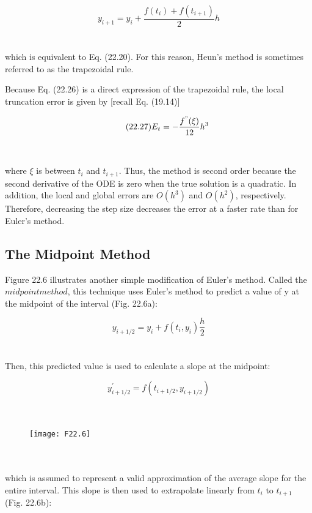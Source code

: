 \documentclass[../main.tex]{subfiles}
\begin{document}
\begin{equation}
\tag{22.26}
y_{i+1} = y_{i} + \dfrac{f(t_{i}) + f(t_{i+1}) }{2}h
\end{equation}\\
\\
which is equivalent to Eq. (22.20). For this reason, Heun's method is sometimes referred to
as the trapezoidal rule.

Because Eq. (22.26) is a direct expression of the trapezoidal rule, the local truncation
error is given by [recall Eq. (19.14)]

\begin{equation}
\tag{22.27}
E_{t} = - \dfrac{f^{"}(\xi)}{12} h^3
\end{equation}\\
\\
where $\xi$ is between $t_{i}$ and $t_{i+1}$. Thus, the method is second order because the second derivative of the ODE is zero when the true solution is a quadratic. In addition, the local and
global errors are $O(h^3)$ and $O(h^2)$, respectively. Therefore, decreasing the step size
decreases the error at a faster rate than for Euler's method.

\subsection{The Midpoint Method}

Figure 22.6 illustrates another simple modification of Euler's method. Called the $midpoint method$, this technique uses Euler's method to predict a value of y at the midpoint of the
interval (Fig. 22.6a):

\begin{equation}
\tag{22.28}
y_{i+1/2} = y_{i} + f(t_{i},y_{i})\dfrac{h}{2}
\end{equation}\\
\\
Then, this predicted value is used to calculate a slope at the midpoint:

\begin{equation}
\tag{22.29}
y^{'}_{i+1/2} = f( t_{i+1/2}, y_{i+1/2} )
\end{equation}\\
\\
\begin{figure}[hbt!]
	\texttt{[image: F22.6]}
	\label{F22.6}
\end{figure}\\
\\
which is assumed to represent a valid approximation of the average slope for the entire
interval. This slope is then used to extrapolate linearly from $t_{i}$ to $t_{i+1}$ (Fig. 22.6b):
\end{document}
